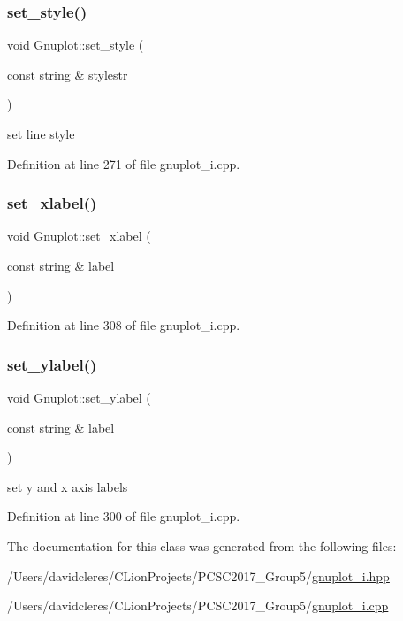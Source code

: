 \subsubsection{\texorpdfstring{set\+\_\+style()}{set\_style()}}
{\footnotesize\ttfamily void Gnuplot\+::set\+\_\+style (\begin{DoxyParamCaption}\item[{const string \&}]{stylestr }\end{DoxyParamCaption})}



set line style 



Definition at line 271 of file gnuplot\+\_\+i.\+cpp.

\mbox{\label{class_gnuplot_ac9b0c04d47e375eb82f50437eda5e46e}} 
\subsubsection{\texorpdfstring{set\+\_\+xlabel()}{set\_xlabel()}}
{\footnotesize\ttfamily void Gnuplot\+::set\+\_\+xlabel (\begin{DoxyParamCaption}\item[{const string \&}]{label }\end{DoxyParamCaption})}



Definition at line 308 of file gnuplot\+\_\+i.\+cpp.

\mbox{\label{class_gnuplot_af85dd1d368699914112460285ead0fde}} 
\subsubsection{\texorpdfstring{set\+\_\+ylabel()}{set\_ylabel()}}
{\footnotesize\ttfamily void Gnuplot\+::set\+\_\+ylabel (\begin{DoxyParamCaption}\item[{const string \&}]{label }\end{DoxyParamCaption})}



set y and x axis labels 



Definition at line 300 of file gnuplot\+\_\+i.\+cpp.



The documentation for this class was generated from the following files\+:\begin{DoxyCompactItemize}
\item 
/\+Users/davidcleres/\+C\+Lion\+Projects/\+P\+C\+S\+C2017\+\_\+\+Group5/\mbox{\hyperlink{gnuplot__i_8hpp}{gnuplot\+\_\+i.\+hpp}}\item 
/\+Users/davidcleres/\+C\+Lion\+Projects/\+P\+C\+S\+C2017\+\_\+\+Group5/\mbox{\hyperlink{gnuplot__i_8cpp}{gnuplot\+\_\+i.\+cpp}}\end{DoxyCompactItemize}
